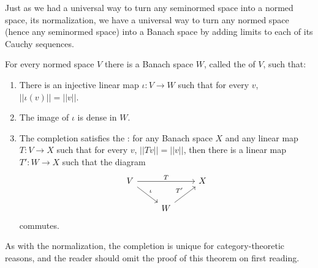 Just as we had a universal way to turn any seminormed space into a normed space, its normalization, we have a universal way to turn any normed space (hence any seminormed space) into a Banach space by adding limits to each of its Cauchy sequences.
\begin{theorem}
\label{completion exists}
For every normed space $V$ there is a Banach space $W$, called the  of $V$, such that:
\begin{enumerate}
\item There is an injective linear map $\iota: V \to W$ such that for every $v$, $||\iota(v)|| = ||v||$.
\item The image of $\iota$ is dense in $W$.
\item The completion satisfies the : for any Banach space $X$ and any linear map $T: V \to X$ such that for every $v$, $||Tv|| = ||v||$, then there is a linear map $T': W \to X$ such that the diagram
$$\begin{tikzcd}
V \arrow[rr,"T"] \arrow[dr,"\iota"] && X\\
& W \arrow[ur,"T'"]
\end{tikzcd}$$
commutes.
\end{enumerate}
\end{theorem}
As with the normalization, the completion is unique for category-theoretic reasons, and the reader should omit the proof of this theorem on first reading.
